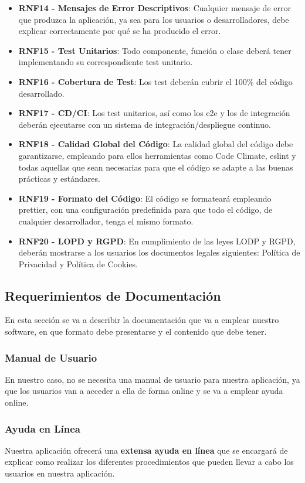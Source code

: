 \begin{itemize}
	\item \textbf{RNF14 - Mensajes de Error Descriptivos}: Cualquier mensaje de error que produzca la aplicación, ya sea para los usuarios o desarrolladores, debe explicar correctamente por qué se ha producido el error.
	\item \textbf{RNF15 - Test Unitarios}: Todo componente, función o clase deberá tener implementando su correspondiente test unitario.
	\item \textbf{RNF16 - Cobertura de Test}: Los test deberán cubrir el 100\% del código desarrollado.
	\item \textbf{RNF17 - CD/CI}: Los test unitarios, así como los e2e y los de integración deberán ejecutarse con un sistema de integración/despliegue continuo.
	\item \textbf{RNF18 - Calidad Global del Código}: La calidad global del código debe garantizarse, empleando para ellos herramientas como Code Climate, eslint y todas aquellas que sean necesarias para que el código se adapte a las buenas prácticas y estándares.
	\item \textbf{RNF19 - Formato del Código}: El código se formateará empleando prettier, con una configuración predefinida para que todo el código, de cualquier desarrollador, tenga el mismo formato.
	\item \textbf{RNF20 - LOPD y RGPD}: En cumplimiento de las leyes LODP y RGPD, deberán mostrarse a los usuarios los documentos legales siguientes: Política de Privacidad y Política de Cookies.
\end{itemize}

\subsection{Requerimientos de Documentación}
En esta sección se va a describir la documentación que va a emplear nuestro software, en que formato debe presentarse y el contenido que debe tener. 

\subsubsection{Manual de Usuario}
En nuestro caso, no se necesita una manual de usuario para nuestra aplicación, ya que los usuarios van a acceder a ella de forma online y se va a emplear ayuda online.

\subsubsection{Ayuda en Línea}
Nuestra aplicación ofrecerá una \textbf{extensa ayuda en línea} que se encargará de explicar como realizar los diferentes procedimientos que pueden llevar a cabo los usuarios en nuestra aplicación.

